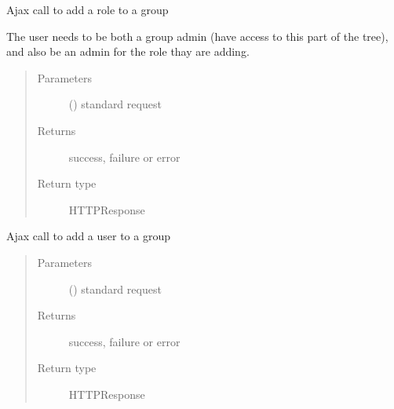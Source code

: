 \documentclass[letterpaper,10pt,english]{sphinxmanual}
\begin{document}
\begin{fulllineitems}
\label{\detokenize{rbac:rbac.ajax.rbac_add_role_to_group_ajax}}
Ajax call to add a role to a group

The user needs to be both a group admin (have access to this part of
the tree), and also be an admin for the role thay are adding.
\begin{quote}\begin{description}
\item[{Parameters}] \leavevmode
{} () \textendash{} standard request

\item[{Returns}] \leavevmode
success, failure or error

\item[{Return type}] \leavevmode
HTTPResponse

\end{description}\end{quote}

\end{fulllineitems}


\begin{fulllineitems}
\label{\detokenize{rbac:rbac.ajax.rbac_add_user_to_group_ajax}}
Ajax call to add a user to a group
\begin{quote}\begin{description}
\item[{Parameters}] \leavevmode
{} () \textendash{} standard request

\item[{Returns}] \leavevmode
success, failure or error

\item[{Return type}] \leavevmode
HTTPResponse

\end{description}\end{quote}

\end{fulllineitems}
\end{document}
